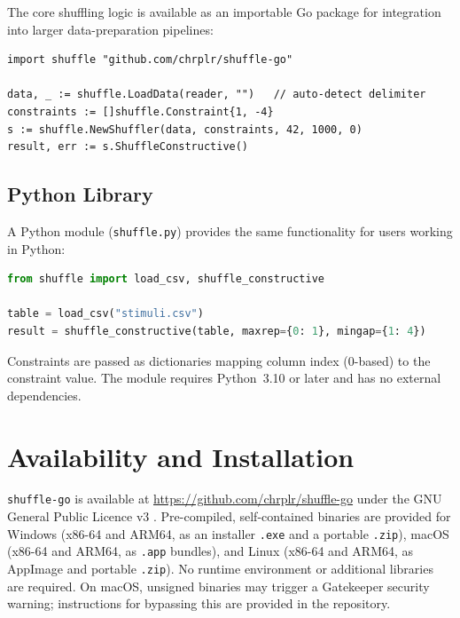 \documentclass[doc,a4paper,biblatex]{apa7}
\begin{document}
The core shuffling logic is available as an importable Go package for
integration into larger data-preparation pipelines:

\begin{lstlisting}[caption={Go library usage example}]
import shuffle "github.com/chrplr/shuffle-go"

data, _ := shuffle.LoadData(reader, "")   // auto-detect delimiter
constraints := []shuffle.Constraint{1, -4}
s := shuffle.NewShuffler(data, constraints, 42, 1000, 0)
result, err := s.ShuffleConstructive()
\end{lstlisting}

\subsection{Python Library}

A Python module (\texttt{shuffle.py}) provides the same functionality for
users working in Python:

\begin{lstlisting}[language=Python,caption={Python library usage example}]
from shuffle import load_csv, shuffle_constructive

table = load_csv("stimuli.csv")
result = shuffle_constructive(table, maxrep={0: 1}, mingap={1: 4})
\end{lstlisting}

\noindent
Constraints are passed as dictionaries mapping column index (0-based) to
the constraint value. The module requires Python~3.10 or later and has
no external dependencies.

\section{Availability and Installation}
\label{sec:availability}

\texttt{shuffle-go} is available at
\url{https://github.com/chrplr/shuffle-go} under the GNU General Public
Licence v3 \parencite{fsf1991}. Pre-compiled, self-contained binaries are
provided for Windows (x86-64 and ARM64, as an installer \texttt{.exe} and
a portable \texttt{.zip}), macOS (x86-64 and ARM64, as \texttt{.app}
bundles), and Linux (x86-64 and ARM64, as AppImage and portable
\texttt{.zip}). No runtime environment or additional libraries are
required. On macOS, unsigned binaries may trigger a Gatekeeper security
warning; instructions for bypassing this are provided in the repository.
\end{document}
